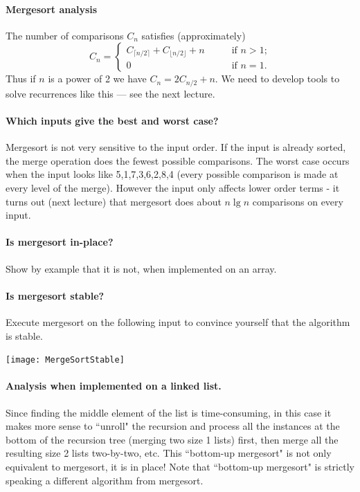 \paragraph{Mergesort analysis}
The number of comparisons $C_n$ satisfies (approximately)
$$ C_n  = \left\{
\begin{array}{ll}
	C_{\lceil n/2 \rceil} + C_{\lfloor n/2 \rfloor} + n & \qquad \text{if }n > 1\text{;} \\
														0 & \qquad \text{if }n = 1\text{.}
\end{array}\right.$$
Thus if $n$ is a power of 2 we have $C_n = 2C_{n/2} + n$. We need to develop tools to solve recurrences like this --- see the next lecture.

\paragraph{Which inputs give the best and worst case?}
Mergesort is not very sensitive to the input order. 
If the input is already sorted, the merge operation does the fewest possible comparisons. The worst case occurs when the input looks like 5,1,7,3,6,2,8,4 (every possible comparison is made at every level of the merge). However the input only affects lower order terms - it turns out 
(next lecture)  that mergesort does about $n\lg n$ comparisons on every input.

\paragraph{Is mergesort in-place?}
\begin{Boxample}[4]
Show by example that it is not, when implemented on an array.
\end{Boxample}

\paragraph{Is mergesort stable?}

\begin{Boxample}[0]
Execute mergesort on the following input to convince yourself that the algorithm is stable.
\begin{center}
\texttt{[image: MergeSortStable]} 
\end{center} 
\end{Boxample}

\paragraph{Analysis when implemented on a linked list.}
Since finding the middle element of the list is time-consuming, in this case it makes more sense to ``unroll" the recursion and process all the instances at the bottom of the recursion tree (merging two size 1 lists) first, then merge all the resulting size 2 lists two-by-two, etc. This ``bottom-up mergesort" is not only equivalent to mergesort, it is in place! Note that ``bottom-up mergesort" is strictly speaking a different algorithm from mergesort.

